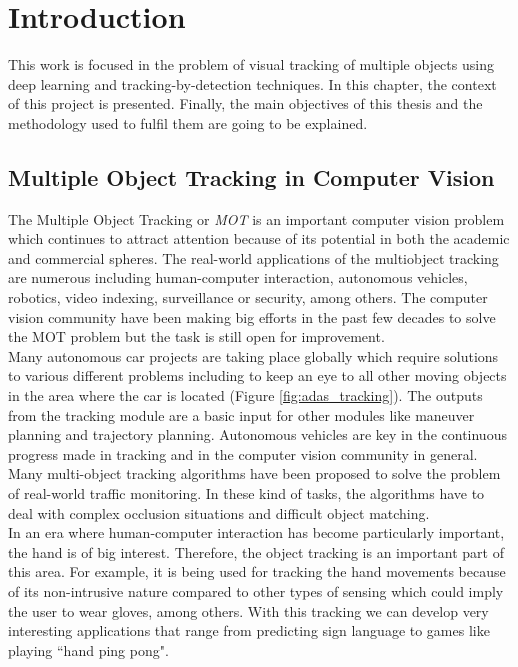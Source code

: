 \chapter{Introduction}\label{cap.introduccion}
\setlength{\parindent}{0pt}
This work is focused in the problem of visual tracking of multiple objects using deep learning and tracking-by-detection techniques. In this chapter, the context of this project is presented. Finally, the main objectives of this thesis and the methodology used to fulfil them are going to be explained.

\section{Multiple Object Tracking in Computer Vision}
The Multiple Object Tracking or \textit{MOT} is an important computer vision problem which continues to attract attention because of its potential in both the academic and commercial spheres. The real-world applications of the multiobject tracking are numerous including human-computer interaction, autonomous vehicles, robotics, video indexing, surveillance or security, among others. The computer vision community have been making big efforts in the past few decades to solve the MOT problem but the task is still open for improvement.\\ Many autonomous car projects are taking place globally which require solutions to various different problems including to keep an eye to all other moving objects in the area where the car is located (Figure \ref{fig:adas_tracking}). The outputs from the tracking module are a basic input for other modules like maneuver planning and trajectory planning. Autonomous vehicles are key in the continuous progress made in tracking and in the computer vision community in general. Many multi-object tracking algorithms have been proposed to solve the problem of real-world traffic monitoring. In these kind of tasks, the algorithms have to deal with complex occlusion situations and difficult object matching.\\
In an era where human-computer interaction has become particularly important, the hand is of big interest. Therefore, the object tracking is an important part of this area. For example, it is being used for tracking the hand movements because of its non-intrusive nature compared to other types of sensing which could imply the user to wear gloves, among others. With this tracking we can develop very interesting applications that range from predicting sign language to games like playing ``hand ping pong".
